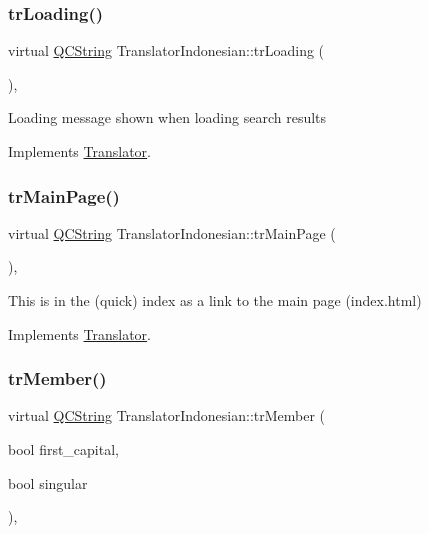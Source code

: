 \subsubsection{\texorpdfstring{trLoading()}{trLoading()}}
{\footnotesize\ttfamily virtual \mbox{\hyperlink{class_q_c_string}{Q\+C\+String}} Translator\+Indonesian\+::tr\+Loading (\begin{DoxyParamCaption}{ }\end{DoxyParamCaption})\hspace{0.3cm}{\ttfamily [inline]}, {\ttfamily [virtual]}}

Loading message shown when loading search results 

Implements \mbox{\hyperlink{class_translator}{Translator}}.

\mbox{\label{class_translator_indonesian_a62223a75fa90bc1118e5d0abeb097dab}} 
\subsubsection{\texorpdfstring{trMainPage()}{trMainPage()}}
{\footnotesize\ttfamily virtual \mbox{\hyperlink{class_q_c_string}{Q\+C\+String}} Translator\+Indonesian\+::tr\+Main\+Page (\begin{DoxyParamCaption}{ }\end{DoxyParamCaption})\hspace{0.3cm}{\ttfamily [inline]}, {\ttfamily [virtual]}}

This is in the (quick) index as a link to the main page (index.\+html) 

Implements \mbox{\hyperlink{class_translator}{Translator}}.

\mbox{\label{class_translator_indonesian_a96bc220bf746c756e0656bdbbc247bce}} 
\subsubsection{\texorpdfstring{trMember()}{trMember()}}
{\footnotesize\ttfamily virtual \mbox{\hyperlink{class_q_c_string}{Q\+C\+String}} Translator\+Indonesian\+::tr\+Member (\begin{DoxyParamCaption}\item[{bool}]{first\+\_\+capital,  }\item[{bool}]{singular }\end{DoxyParamCaption})\hspace{0.3cm}{\ttfamily [inline]}, {\ttfamily [virtual]}}

